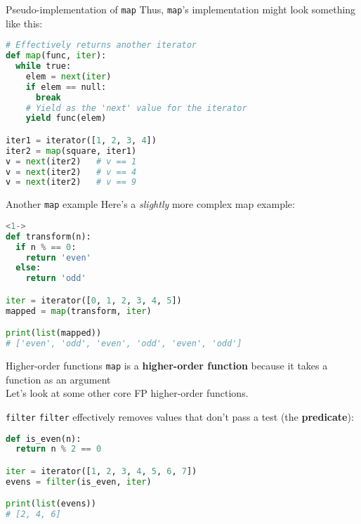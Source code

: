 \documentclass[../index.tex]{subfiles}
\begin{document}
\renewcommand{\currenttitle}{Pseudo-implementation of \texttt{map}}
\begin{frame}[fragile]{\currenttitle}
  Thus, \texttt{map}'s implementation might look something like this: \\[1em]

  \begin{lstlisting}[language=Python]
# Effectively returns another iterator
def map(func, iter):
  while true:
    elem = next(iter)
    if elem == null:
      break
    # Yield as the 'next' value for the iterator
    yield func(elem)

iter1 = iterator([1, 2, 3, 4])
iter2 = map(square, iter1)
v = next(iter2)   # v == 1
v = next(iter2)   # v == 4
v = next(iter2)   # v == 9
  \end{lstlisting}
\end{frame}

\renewcommand{\currenttitle}{Another \texttt{map} example}
\begin{frame}[fragile]{\currenttitle}
  Here's a \textit{slightly} more complex map example:

  \begin{lstlisting}[language=Python]<1->
def transform(n):
  if n % == 0:
    return 'even'
  else:
    return 'odd'

iter = iterator([0, 1, 2, 3, 4, 5])
mapped = map(transform, iter)

print(list(mapped))
# ['even', 'odd', 'even', 'odd', 'even', 'odd']
  \end{lstlisting}
\end{frame}

\renewcommand{\currenttitle}{Higher-order functions}
\begin{frame}[fragile]{\currenttitle}
  \texttt{map} is a \textbf{higher-order function} because it takes a function
  as an argument \\[2em]

  Let's look at some other core FP higher-order functions.
\end{frame}

\renewcommand{\currenttitle}{\texttt{filter}}
\begin{frame}[fragile]{\currenttitle}
  \texttt{filter} effectively removes values that don't pass a test (the
  \textbf{predicate}):

  \begin{lstlisting}[language=Python]
def is_even(n):
  return n % 2 == 0

iter = iterator([1, 2, 3, 4, 5, 6, 7])
evens = filter(is_even, iter)

print(list(evens))
# [2, 4, 6]
  \end{lstlisting}
\end{frame}
\end{document}
